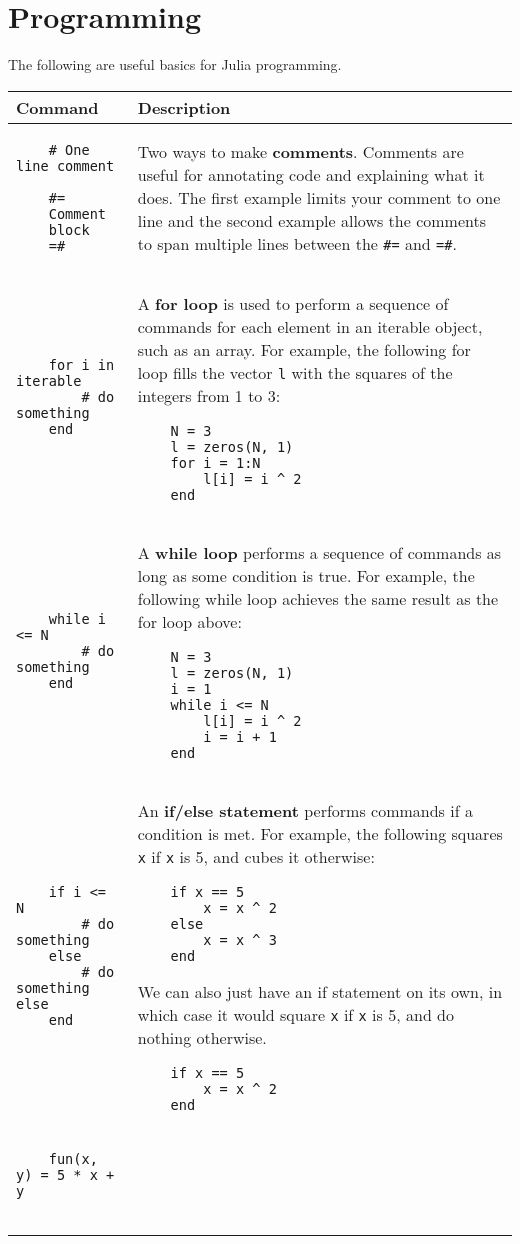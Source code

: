 \documentclass[]{article}
\begin{document}
\section{Programming}
The following are useful basics for Julia programming.
\begin{longtable}{ |m{6cm}  | m{11cm} |}
	\hline
	\textbf{Command} & \textbf{Description}
	\\\hline
	\begin{verbatim}
    # One line comment

    #=
    Comment 
    block
    =#
	\end{verbatim}
	& Two ways to make \textbf{comments}. Comments are useful for annotating
    code and explaining what it does. The first example limits your comment to
    one line and the second example allows the comments to span multiple lines
    between the \texttt{\#=} and \texttt{=\#}.
    \\\hline
\begin{verbatim}
    for i in iterable
        # do something
    end
	\end{verbatim}
	& A \textbf{for loop} is used to perform a sequence of commands for each
    element in an iterable object, such as an array. For example, the
    following for loop fills the vector \texttt{l} with the squares of the
    integers from 1 to 3:
    \begin{verbatim}
    N = 3
    l = zeros(N, 1)
    for i = 1:N
        l[i] = i ^ 2
    end
    \end{verbatim}
    \\\hline
\begin{verbatim}
    while i <= N
        # do something
    end
	\end{verbatim}
	& A \textbf{while loop} performs a sequence of commands as long as some
    condition is true. For example, the
    following while loop achieves the same result as the for loop above:
    \begin{verbatim}
    N = 3
    l = zeros(N, 1)
    i = 1
    while i <= N
        l[i] = i ^ 2
        i = i + 1
    end
    \end{verbatim}
    \\\hline
\begin{verbatim}
    if i <= N
        # do something
    else
        # do something else
    end
	\end{verbatim}
	& An \textbf{if/else statement} performs commands if a condition is met. For example, the
    following squares \texttt{x} if \texttt{x} is 5, and cubes it otherwise:
    \begin{verbatim}
    if x == 5
        x = x ^ 2
    else
        x = x ^ 3
    end
    \end{verbatim}
    We can also just have an if statement on its own, in which case it would
    square \texttt{x} if \texttt{x} is 5, and do nothing otherwise.
    \begin{verbatim}
    if x == 5
        x = x ^ 2
    end
    \end{verbatim}
    \\\hline
\begin{verbatim}
    fun(x, y) = 5 * x + y


\end{verbatim}
\end{longtable}
\end{document}
